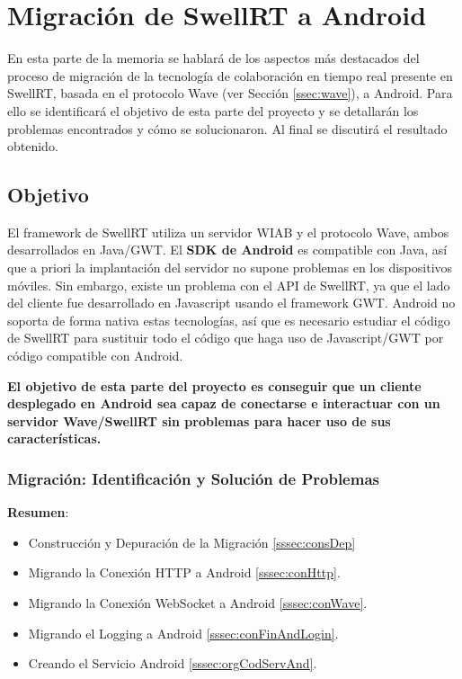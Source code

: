 \newpage
\thispagestyle{sectioned}
\chapter{Migración de SwellRT a Android}

	En esta parte de la memoria se hablará de los aspectos más destacados del proceso de migración de la tecnología de colaboración en tiempo real presente en SwellRT, basada en el protocolo Wave (ver Sección \ref{ssec:wave}), a Android. Para ello se identificará el objetivo de esta parte del proyecto y se detallarán los problemas encontrados y cómo se solucionaron. Al final se discutirá el resultado obtenido. 

  \section{Objetivo} \label{sec:migration}
  
    El framework de SwellRT utiliza un servidor WIAB y el protocolo Wave, ambos desarrollados en Java/GWT. El \textbf{SDK de Android} \cite{ref:android_sdk} es compatible con Java, así que a priori la implantación del servidor no supone problemas en los dispositivos móviles. Sin embargo, existe un problema con el API de SwellRT, ya que el lado del cliente fue desarrollado en Javascript usando el framework GWT. Android no soporta de forma nativa estas tecnologías, así que es necesario estudiar el código de SwellRT para sustituir todo el código que haga uso de Javascript/GWT por código compatible con Android. 
    
    \textbf{El objetivo de esta parte del proyecto es conseguir que un cliente desplegado en Android sea capaz de conectarse e interactuar con un servidor Wave/SwellRT sin problemas para hacer uso de sus características.}  

	\subsection{Migración: Identificación y Solución de Problemas}	
	
	\textbf{Resumen}:
	
	\begin{itemize}
	  \item Construcción y Depuración de la Migración \ref{sssec:consDep}
	  \item Migrando la Conexión HTTP a Android \ref{sssec:conHttp}.
	  \item Migrando la Conexión WebSocket a Android \ref{sssec:conWave}.
	  \item Migrando el Logging a Android \ref{sssec:conFinAndLogin}.
	  \item Creando el Servicio Android \ref{sssec:orgCodServAnd}.
	\end{itemize}
	
